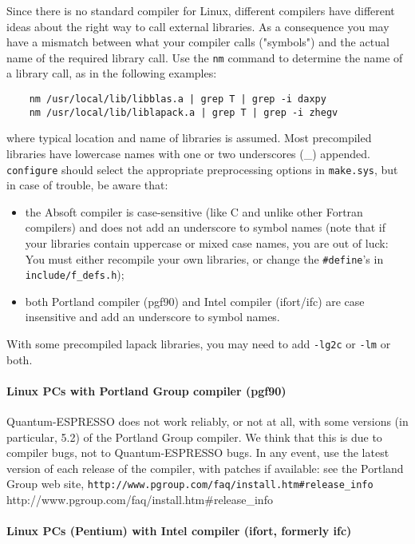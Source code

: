 \documentclass[12pt,a4paper]{article}
\begin{document}
Since there is no standard compiler for Linux, different compilers
have different ideas about the right way to call external libraries.
As a consequence you may have a mismatch between what your compiler
calls ("symbols") and the actual name of the required library call.
Use the \texttt{nm} command to determine the name of a library call,
as in the following examples:%
\begin{verbatim}
    nm /usr/local/lib/libblas.a | grep T | grep -i daxpy
    nm /usr/local/lib/liblapack.a | grep T | grep -i zhegv
\end{verbatim}
where typical location and name of libraries is assumed.
Most precompiled libraries have lowercase names with one or two
underscores (\_) appended. \texttt{configure} should select the 
appropriate preprocessing options in \texttt{make.sys}, but in
case of trouble, be aware that:
\begin{itemize}
  \item the Absoft compiler is case-sensitive (like C and unlike
        other Fortran compilers) and does not add an underscore
        to symbol names (note that if your libraries contain 
        uppercase or mixed case names, you are out of luck:
        You must either recompile your own libraries, or change 
        the \texttt{\#define}'s in \texttt{include/f\_defs.h});
  \item both Portland compiler (pgf90) and Intel compiler (ifort/ifc)
        are case insensitive and add an underscore to symbol names.
\end{itemize}

With some precompiled lapack libraries, you may need to add
\texttt{-lg2c} or \texttt{-lm} or both.

\paragraph{Linux PCs with Portland Group compiler (pgf90)}

\hfill\break
Quantum-ESPRESSO does not work reliably, or not at all, with some 
versions (in particular, 5.2) of the Portland Group compiler.
We think that this is due to compiler bugs, not to Quantum-ESPRESSO
bugs. In any event, use the latest version of each release of the 
compiler, with patches if available: see the Portland Group web
site,\hfill\break
\htmladdnormallink%
{\texttt{http://www.pgroup.com/faq/install.htm\#release\_info}}%
{http://www.pgroup.com/faq/install.htm\#release\_info}

\paragraph{Linux PCs (Pentium) with Intel compiler (ifort, formerly
ifc)}
\end{document}
